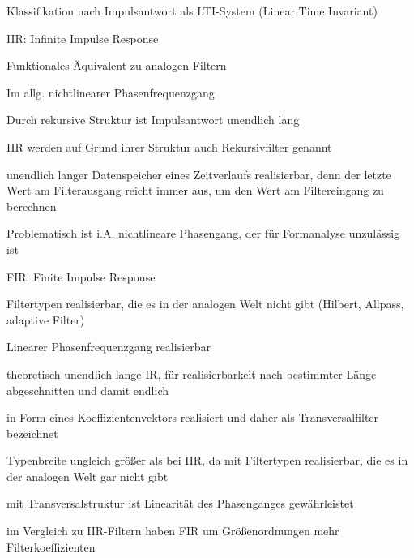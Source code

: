 \documentclass[a4paper]{article}
\begin{document}
\begin{multicols}{3}
  Klassifikation nach Impulsantwort als LTI-System (Linear Time Invariant)
  \begin{itemize*}
    \item IIR: Infinite Impulse Response
    \begin{itemize*}
      \item Funktionales Äquivalent zu analogen Filtern
      \item Im allg. nichtlinearer Phasenfrequenzgang
      \item Durch rekursive Struktur ist Impulsantwort unendlich lang
      \item IIR werden auf Grund ihrer Struktur auch Rekursivfilter genannt
      \item unendlich langer Datenspeicher eines Zeitverlaufs realisierbar, denn der letzte Wert am Filterausgang reicht immer aus, um den Wert am Filtereingang zu berechnen
      \item Problematisch ist i.A. nichtlineare Phasengang, der für Formanalyse unzulässig ist
    \end{itemize*}
    \item FIR: Finite Impulse Response
    \begin{itemize*}
      \item Filtertypen realisierbar, die es in der analogen Welt nicht gibt (Hilbert, Allpass, adaptive Filter)
      \item Linearer Phasenfrequenzgang realisierbar
      \item theoretisch unendlich lange IR, für realisierbarkeit nach bestimmter Länge abgeschnitten und damit endlich
      \item in Form eines Koeffizientenvektors realisiert und daher als Transversalfilter bezeichnet
      \item Typenbreite ungleich größer als bei IIR, da mit Filtertypen realisierbar, die es in der analogen Welt gar nicht gibt
      \item mit Transversalstruktur ist Linearität des Phasenganges gewährleistet
      \item im Vergleich zu IIR-Filtern haben FIR um Größenordnungen mehr Filterkoeffizienten
    \end{itemize*}
  \end{itemize*}


\end{multicols}
\end{document}

